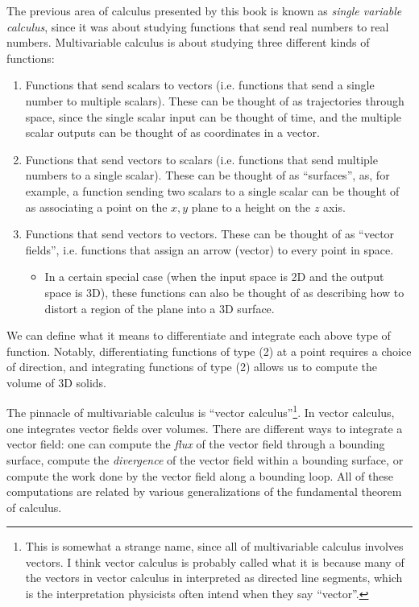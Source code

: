The previous area of calculus presented by this book is known as \textit{single variable calculus}, since it was about studying functions that send real numbers to real numbers. Multivariable calculus is about studying three different kinds of functions:

\begin{enumerate}
    \item Functions that send scalars to vectors (i.e. functions that send a single number to multiple scalars). These can be thought of as trajectories through space, since the single scalar input can be thought of time, and the multiple scalar outputs can be thought of as coordinates in a vector.
    
    \item Functions that send vectors to scalars (i.e. functions that send multiple numbers to a single scalar). These can be thought of as ``surfaces'', as, for example, a function sending two scalars to a single scalar can be thought of as associating a point on the $x, y$ plane to a height on the $z$ axis.

    \item Functions that send vectors to vectors. These can be thought of as ``vector fields'', i.e. functions that assign an arrow (vector) to every point in space.
    \begin{itemize}
        \item In a certain special case (when the input space is 2D and the output space is 3D), these functions can also be thought of as describing how to distort a region of the plane into a 3D surface.
    \end{itemize}
\end{enumerate}

We can define what it means to differentiate and integrate each above type of function. Notably, differentiating functions of type (2) at a point requires a choice of direction, and integrating functions of type (2) allows us to compute the volume of 3D solids.

The pinnacle of multivariable calculus is ``vector calculus''\footnote{This is somewhat a strange name, since all of multivariable calculus involves vectors. I think vector calculus is probably called what it is because many of the vectors in vector calculus in interpreted as directed line segments, which is the interpretation physicists often intend when they say ``vector''.}. In vector calculus, one integrates vector fields over volumes. There are different ways to integrate a vector field: one can compute the \textit{flux} of the vector field through a bounding surface, compute the \textit{divergence} of the vector field within a bounding surface, or compute the work done by the vector field along a bounding loop. All of these computations are related by various generalizations of the fundamental theorem of calculus.


